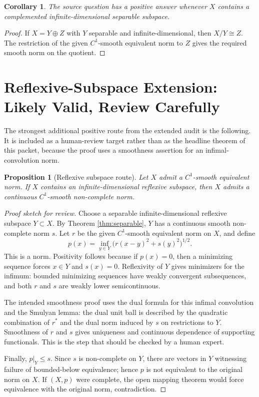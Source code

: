 \documentclass[11pt]{article}
\newtheorem{proposition}{Proposition}
\newtheorem{corollary}{Corollary}
\theoremstyle{remark}
\begin{document}
\begin{corollary}
The source question has a positive answer whenever \(X\) contains a
complemented infinite-dimensional separable subspace.
\end{corollary}

\begin{proof}
If \(X=Y\oplus Z\) with \(Y\) separable and infinite-dimensional, then
\(X/Y\cong Z\).  The restriction of the given \(C^1\)-smooth equivalent norm to
\(Z\) gives the required smooth norm on the quotient.
\end{proof}

\section*{Reflexive-Subspace Extension: Likely Valid, Review Carefully}

The strongest additional positive route from the extended audit is the
following.  It is included as a human-review target rather than as the
headline theorem of this packet, because the proof uses a smoothness assertion
for an infimal-convolution norm.

\begin{proposition}[Reflexive subspace route]
\label{prop:reflexive}
Let \(X\) admit a \(C^1\)-smooth equivalent norm.  If \(X\) contains an
infinite-dimensional reflexive subspace, then \(X\) admits a continuous
\(C^1\)-smooth non-complete norm.
\end{proposition}

\begin{proof}[Proof sketch for review]
Choose a separable infinite-dimensional reflexive subspace \(Y\subset X\).
By Theorem \ref{thm:separable}, \(Y\) has a continuous smooth non-complete norm
\(s\).  Let \(r\) be the given \(C^1\)-smooth equivalent norm on \(X\), and
define
\[
        p(x)=\inf_{y\in Y}\bigl(r(x-y)^2+s(y)^2\bigr)^{1/2}.
\]
This is a norm.  Positivity follows because if \(p(x)=0\), then a minimizing
sequence forces \(x\in Y\) and \(s(x)=0\).  Reflexivity of \(Y\) gives
minimizers for the infimum: bounded minimizing sequences have weakly
convergent subsequences, and both \(r\) and \(s\) are weakly lower
semicontinuous.

The intended smoothness proof uses the dual formula for this infimal
convolution and the Smulyan lemma: the dual unit ball is described by the
quadratic combination of \(r^*\) and the dual norm induced by \(s\) on
restrictions to \(Y\).  Smoothness of \(r\) and \(s\) gives uniqueness and
continuous dependence of supporting functionals.  This is the step that should
be checked by a human expert.

Finally, \(p|_Y\leq s\).  Since \(s\) is non-complete on \(Y\), there are
vectors in \(Y\) witnessing failure of bounded-below equivalence; hence \(p\)
is not equivalent to the original norm on \(X\).  If \((X,p)\) were complete,
the open mapping theorem would force equivalence with the original norm,
contradiction.
\end{proof}
\end{document}
